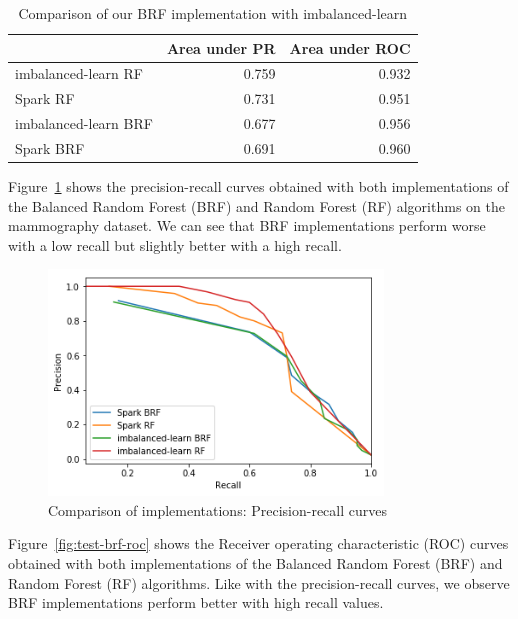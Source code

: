 \documentclass[conference]{IEEEtran}
\begin{document}
\begin{table}[htbp]
\caption{Comparison of our BRF implementation with imbalanced-learn}
\begin{center}
\begin{tabular}{|l|r|r|}
\cline{2-3}
\multicolumn{1}{c|}{} &  Area under PR &  Area under ROC \\
\hline
imbalanced-learn RF  &          0.759 &           0.932 \\
Spark RF             &          0.731 &           0.951 \\
imbalanced-learn BRF &          0.677 &           0.956 \\
Spark BRF            &          0.691 &           0.960 \\
\hline
\end{tabular}
\label{table:test_brf_results}
\end{center}
\end{table}

Figure~\ref{fig:test-brf-precision-recall} shows the precision-recall curves obtained with both implementations of the Balanced Random Forest (BRF) and Random Forest (RF) algorithms on the mammography dataset. We can see that BRF implementations perform worse with a low recall but slightly better with a high recall.

\begin{figure}[htbp]
\centerline{\includegraphics[height=6cm, keepaspectratio]{Figures/test_brf_pr.png}}
\caption{Comparison of implementations: Precision-recall curves}
\label{fig:test-brf-precision-recall}
\end{figure}

Figure~\ref{fig:test-brf-roc} shows the Receiver operating characteristic (ROC) curves obtained with both implementations of the Balanced Random Forest (BRF) and Random Forest (RF) algorithms. Like with the precision-recall curves, we observe BRF implementations perform better with high recall values. 
\end{document}
